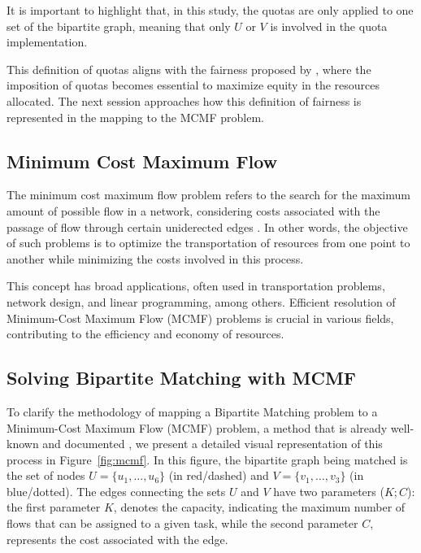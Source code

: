             It is important to highlight that, in this study, the quotas are only applied to one set of the bipartite graph, meaning that only $U$ or $V$ is involved in the quota implementation.
            
            This definition of quotas aligns with the fairness proposed by \cite{sankar}, where the imposition of quotas becomes essential to maximize equity in the resources allocated. The next session approaches how this definition of fairness is represented in the mapping to the MCMF problem. 
            
        \subsection{Minimum Cost Maximum Flow}
            
            The minimum cost maximum flow problem refers to the search for the maximum amount of possible flow in a network, considering costs associated with the passage of flow through certain uniderected edges \cite{korte2018combinatorial, ford1956maximal}. In other words, the objective of such problems is to optimize the transportation of resources from one point to another while minimizing the costs involved in this process.
            
            This concept has broad applications, often used in transportation problems, network design, and linear programming, among others. Efficient resolution of Minimum-Cost Maximum Flow (MCMF) problems is crucial in various fields, contributing to the efficiency and economy of resources.
            
        \subsection{Solving Bipartite Matching with MCMF}\label{subsubsec:resolucao-fluxo-matching}
            
            To clarify the methodology of mapping a Bipartite Matching problem to a Minimum-Cost Maximum Flow (MCMF) problem, a method that is already well-known and documented \cite{ahuja1993network, edmonds1972theoretical, tarjan1997dynamic}, we present a detailed visual representation of this process in Figure~\ref{fig:mcmf}.
            In this figure, the bipartite graph being matched is the set of nodes $U = \{u_1, \ldots, u_6\}$ (in red/dashed) and $V = \{v_1, \ldots, v_3\}$ (in blue/dotted). 
            The edges connecting the sets $U$ and $V$ have two parameters ($K;C$): the first parameter $K$, denotes the capacity, indicating the maximum number of flows that can be assigned to a given task, while the second parameter $C$, represents the cost associated with the edge. 

